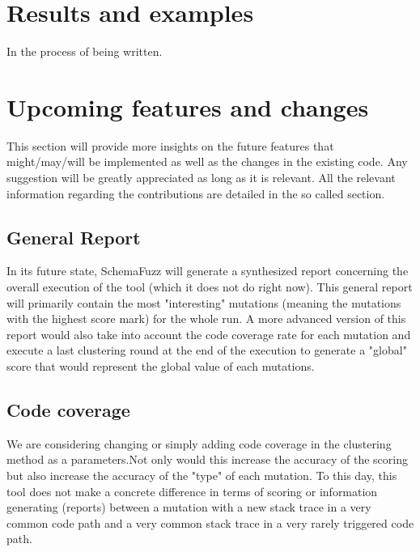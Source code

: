 \documentclass{article}
\begin{document}
\begin{empfile}
			\clearpage

	\section{Results and examples}
In the process of being written.

			\clearpage
	\section{Upcoming features and changes}
This section will provide more insights on the future features that might/may/will be implemented as well as the changes in the existing code.
Any suggestion will be greatly appreciated as long as it is relevant. All the relevant information regarding the contributions are detailed in the so called section.

		\subsection{General Report}
In its future state, SchemaFuzz will generate a synthesized report concerning the overall execution of the tool (which it does not do right now). This general report will primarily contain the most "interesting" mutations (meaning the mutations with the highest score mark) for the whole run.
A more advanced version of this report would also take into account the code coverage rate for each mutation and execute a last clustering round at the end of the execution to generate a "global" score that would represent the global value of each mutations.
	
		\subsection{Code coverage}
We are considering changing or simply adding code coverage in the clustering method as a parameters.Not only would this increase the accuracy of the scoring but also increase the accuracy of the "type" of each mutation. To this day, this tool does not make a concrete difference in terms of scoring or information generating (reports) between a mutation with a new stack trace in a very common code path and a very common stack trace in a very rarely triggered code path.


\end{empfile}
\end{document}
